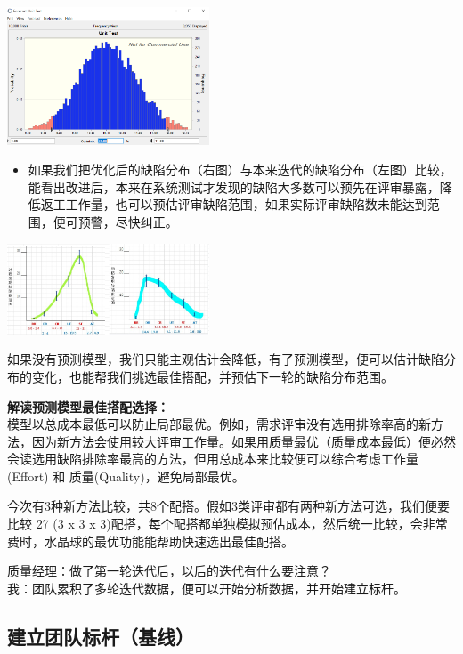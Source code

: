 \includegraphics[width=6cm]{YH-UT.PNG}

\begin{itemize}
\tightlist
\item
  如果我们把优化后的缺陷分布（右图）与本来迭代的缺陷分布（左图）比较，能看出改进后，本来在系统测试才发现的缺陷大多数可以预先在评审暴露，降低返工工作量，也可以预估评审缺陷范围，如果实际评审缺陷数未能达到范围，便可预警，尽快纠正。
\end{itemize}

\includegraphics[width=6cm]{MTKL.png}

如果没有预测模型，我们只能主观估计会降低，有了预测模型，便可以估计缺陷分布的变化，也能帮我们挑选最佳搭配，并预估下一轮的缺陷分布范围。

\textbf{解读预测模型最佳搭配选择：}\\
模型以总成本最低可以防止局部最优。例如，需求评审没有选用排除率高的新方法，因为新方法会使用较大评审工作量。如果用质量最优（质量成本最低）便必然会读选用缺陷排除率最高的方法，但用总成本来比较便可以综合考虑工作量(Effort)
和 质量(Quality)，避免局部最优。

今次有3种新方法比较，共8个配搭。假如3类评审都有两种新方法可选，我们便要比较
27 (3 x 3 x
3)配搭，每个配搭都单独模拟预估成本，然后统一比较，会非常费时，水晶球的最优功能能帮助快速选出最佳配搭。

质量经理：做了第一轮迭代后，以后的迭代有什么要注意？\\
我：团队累积了多轮迭代数据，便可以开始分析数据，并开始建立标杆。\\

\hypertarget{ux5efaux7acbux56e2ux961fux6807ux6746ux57faux7ebf}{%
\subsection{建立团队标杆（基线）}\label{ux5efaux7acbux56e2ux961fux6807ux6746ux57faux7ebf}}

